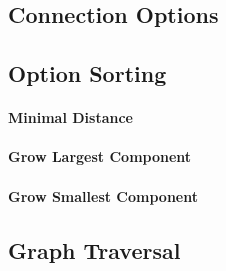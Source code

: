 

\subsection{Connection Options}



\subsection{Option Sorting}


\paragraph{Minimal Distance}

\paragraph{Grow Largest Component}

\paragraph{Grow Smallest Component}



\subsection{Graph Traversal}


